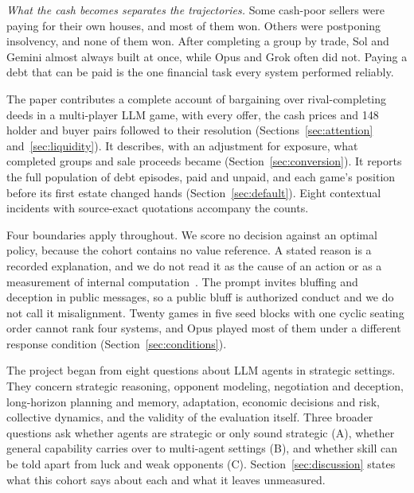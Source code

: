 \emph{What the cash becomes separates the trajectories.} Some cash-poor sellers were paying for their own houses, and most of them won. Others were postponing insolvency, and none of them won. After completing a group by trade, Sol and Gemini almost always built at once, while Opus and Grok often did not. Paying a debt that can be paid is the one financial task every system performed reliably.

The paper contributes a complete account of bargaining over rival-completing deeds in a multi-player LLM game, with every offer, the cash prices and 148 holder and buyer pairs followed to their resolution (Sections~\ref{sec:attention} and~\ref{sec:liquidity}). It describes, with an adjustment for exposure, what completed groups and sale proceeds became (Section~\ref{sec:conversion}). It reports the full population of debt episodes, paid and unpaid, and each game's position before its first estate changed hands (Section~\ref{sec:default}). Eight contextual incidents with source-exact quotations accompany the counts.

Four boundaries apply throughout. We score no decision against an optimal policy, because the cohort contains no value reference. A stated reason is a recorded explanation, and we do not read it as the cause of an action or as a measurement of internal computation~\cite{turpin2023unfaithful,lanham2023faithfulness}. The prompt invites bluffing and deception in public messages, so a public bluff is authorized conduct and we do not call it misalignment. Twenty games in five seed blocks with one cyclic seating order cannot rank four systems, and Opus played most of them under a different response condition (Section~\ref{sec:conditions}).

The project began from eight questions about LLM agents in strategic settings. They concern strategic reasoning, opponent modeling, negotiation and deception, long-horizon planning and memory, adaptation, economic decisions and risk, collective dynamics, and the validity of the evaluation itself. Three broader questions ask whether agents are strategic or only sound strategic (A), whether general capability carries over to multi-agent settings (B), and whether skill can be told apart from luck and weak opponents (C). Section~\ref{sec:discussion} states what this cohort says about each and what it leaves unmeasured.
